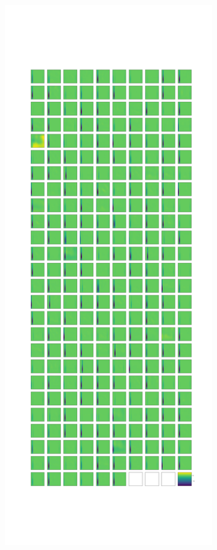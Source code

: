\begin{figure}
\begin{subfigure}{0.3\textwidth}
        \includegraphics[width=\textwidth]{images/stripes/leaky_re_lu_5.png}

\end{subfigure}
\end{figure}
